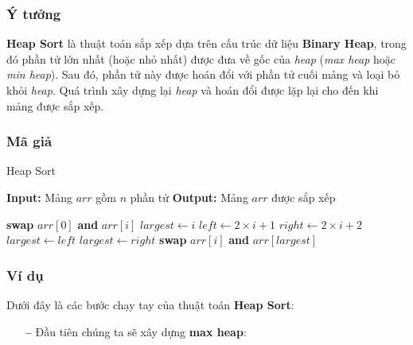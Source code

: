 \subsubsection{Ý tưởng}
\textbf{Heap Sort} là thuật toán sắp xếp dựa trên cấu trúc dữ liệu \textbf{Binary Heap}, trong đó phần tử lớn nhất (hoặc nhỏ nhất) được đưa về gốc của \textit{heap} (\textit{max heap} hoặc \textit{min heap}). Sau đó, phần tử này được hoán đổi với phần tử cuối mảng và loại bỏ khỏi \textit{heap}. Quá trình xây dựng lại \textit{heap} và hoán đổi được lặp lại cho đến khi mảng được sắp xếp.

\subsubsection{Mã giả}
\begin{algorithm}[H]
\caption{Heap Sort}
\begin{algorithmic}[1]
    \State \textbf{Input:} Mảng $arr$ gồm $n$ phần tử
    \State \textbf{Output:} Mảng $arr$ được sắp xếp
    
        \State {}
    \EndFor
    
        \State \textbf{swap} $arr[0]$ \textbf{and} $arr[i]$
        \State {}
    \EndFor
\EndProcedure
{}
    \State $largest \gets i$
    \State $left \gets 2\times i + 1$
    \State $right \gets 2\times i + 2$
        \State $largest \gets left$
    \EndIf
        \State $largest \gets right$
    \EndIf
        \State \textbf{swap} $arr[i]$ \textbf{and} $arr[largest]$
        \State {}
    \EndIf
\EndProcedure
\end{algorithmic}
\end{algorithm}

\subsubsection{Ví dụ}
Dưới đây là các bước chạy tay của thuật toán \textbf{Heap Sort}:

\begin{itemize}
    \item [\textbf{--}] Đầu tiên chúng ta sẽ xây dựng \textbf{max heap}:
\end{itemize}

